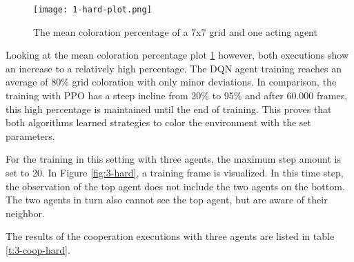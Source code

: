 \begin{figure}[hpbt]
    \centering
    \texttt{[image: 1-hard-plot.png]}\\
    \caption[Mean Coloration Percentage of one Agent in a 7x7 Environment]{The mean coloration percentage of a 7x7 grid and one acting agent}\label{fig:1-hard-plot}
\end{figure}

Looking at the mean coloration percentage plot \ref{fig:1-hard-plot} however, both executions show an increase to a relatively high percentage. The DQN agent training reaches an average of 80\% grid coloration with only minor deviations. In comparison, the training with PPO has a steep incline from 20\% to 95\% and after 60.000 frames, this high percentage is maintained until the end of training. This proves that both algorithms learned strategies to color the environment with the set parameters.

For the training in this setting with three agents, the maximum step amount is set to 20. In Figure \ref{fig:3-hard}, a training frame is visualized. In this time step, the observation of the top agent does not include the two agents on the bottom. The two agents in turn also cannot see the top agent, but are aware of their neighbor. 

The results of the cooperation executions with three agents are listed in table \ref{t:3-coop-hard}. \\


